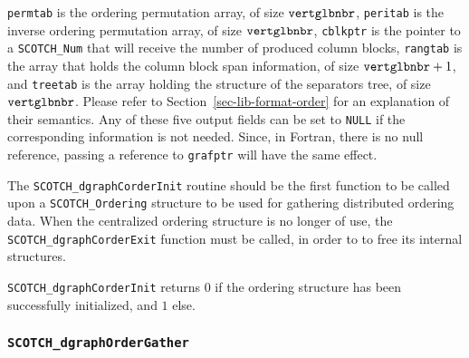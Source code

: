\begin{itemize}
{\tt permtab} is the ordering permutation array, of size ${\tt
vert\lbt glb\lbt nbr}$, {\tt peritab} is the inverse ordering permutation array,
of size ${\tt vert\lbt glb\lbt nbr}$, {\tt cblkptr} is the pointer to a
{\tt SCOTCH\_\lbt Num} that will receive the number of produced
column blocks, {\tt rangtab} is the array that holds the column block
span information, of size $\mbox{\tt vert\lbt glb\lbt nbr} + 1$, and {\tt treetab}
is the array holding the structure of the separators tree, of size
${\tt vert\lbt glb\lbt nbr}$. Please refer to
Section~\ref{sec-lib-format-order} for an explanation of their semantics.
Any of these five output fields can be set to {\tt NULL} if the
corresponding information is not needed. Since, in Fortran, there is
no null reference, passing a reference to {\tt grafptr} will have the
same effect.

The {\tt SCOTCH\_\lbt dgraph\lbt Corder\lbt Init} routine should be
the first function to be called upon a {\tt SCOTCH\_\lbt Ordering}
structure to be used for gathering distributed ordering data. When the
centralized ordering structure is no longer of use, the {\tt
SCOTCH\_\lbt dgraph\lbt Corder\lbt Exit} function must be called, in
order to to free its internal structures.

\progret

{\tt SCOTCH\_dgraphCorderInit} returns $0$ if the ordering structure has
been successfully initialized, and $1$ else.
\end{itemize}

\subsubsection{{\tt SCOTCH\_dgraphOrderGather}}
\label{sec-lib-dgraph-order-gather}

